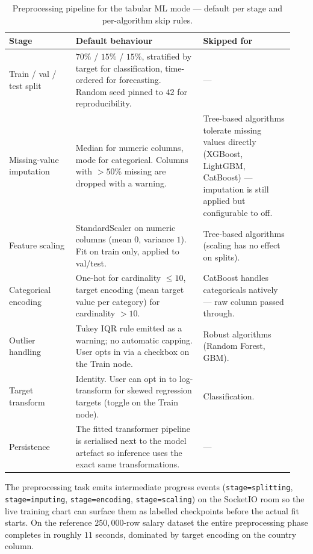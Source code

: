 \documentclass[12pt, a4paper, oneside]{report}
\begin{document}
\begin{table}[H]
\centering
\caption{Preprocessing pipeline for the tabular ML mode --- default per stage and per-algorithm skip rules.}
\label{tab:preprocessing}
\begin{tabular}{|p{0.22\linewidth}|L{0.42\linewidth}|L{0.30\linewidth}|}
\hline
\textbf{Stage} & \textbf{Default behaviour} & \textbf{Skipped for} \\
\hline
Train / val / test split & $70\%$ / $15\%$ / $15\%$, stratified by target for classification, time-ordered for forecasting. Random seed pinned to $42$ for reproducibility. & --- \\ \hline
Missing-value imputation & Median for numeric columns, mode for categorical. Columns with $>50\%$ missing are dropped with a warning. & Tree-based algorithms tolerate missing values directly (XGBoost, LightGBM, CatBoost) --- imputation is still applied but configurable to off. \\ \hline
Feature scaling & StandardScaler on numeric columns (mean $0$, variance $1$). Fit on train only, applied to val/test. & Tree-based algorithms (scaling has no effect on splits). \\ \hline
Categorical encoding & One-hot for cardinality $\le 10$, target encoding (mean target value per category) for cardinality $> 10$. & CatBoost handles categoricals natively --- raw column passed through. \\ \hline
Outlier handling & Tukey IQR rule emitted as a warning; no automatic capping. User opts in via a checkbox on the Train node. & Robust algorithms (Random Forest, GBM). \\ \hline
Target transform & Identity. User can opt in to log-transform for skewed regression targets (toggle on the Train node). & Classification. \\ \hline
Persistence & The fitted transformer pipeline is serialised next to the model artefact so inference uses the exact same transformations. & --- \\
\hline
\end{tabular}
\end{table}

The preprocessing task emits intermediate progress events
(\texttt{stage=splitting}, \texttt{stage=imputing},
\texttt{stage=encoding}, \texttt{stage=scaling}) on the SocketIO
room so the live training chart can surface them as labelled
checkpoints before the actual fit starts. On the reference
$250{,}000$-row salary dataset the entire preprocessing phase
completes in roughly $11$ seconds, dominated by target encoding on
the country column.
\end{document}
